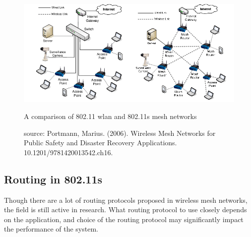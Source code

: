 \begin{figure}
	\centering
	\includegraphics[scale=0.6]{Pictures/80211s.png}
	\caption{A comparison of 802.11 wlan and 802.11s mesh networks}
	\label{fig: 80211s}
	\caption*{source: Portmann, Marius. (2006). Wireless Mesh Networks for Public Safety and Disaster Recovery Applications. 10.1201/9781420013542.ch16. }
\end{figure}

\subsection{Routing in 802.11s}
Though there are a lot of routing protocols proposed in wireless mesh networks, the field is still active in research. What routing protocol to use closely depends on the application, and choice of the routing protocol may significantly impact the performance of the system.  